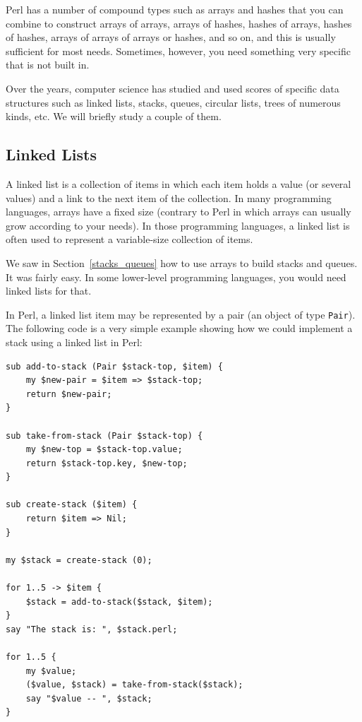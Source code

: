 Perl has a number of compound types such as arrays and hashes 
that you can combine to construct arrays of arrays, arrays of 
hashes, hashes of arrays, hashes of hashes, arrays of arrays of 
arrays or hashes, and so on, and this is usually sufficient for 
most needs. Sometimes, however, you need something very specific 
that is not built in.

Over the years, computer science has studied and used scores of 
specific data structures such as linked lists, stacks, queues, 
circular lists, trees of numerous kinds, etc. We will briefly 
study a couple of them.

\subsection{Linked Lists}
\label{linked_list}

A linked list is a collection of items in which each item holds 
a value (or several values) and a link to the next item of the 
collection. In many programming languages, arrays have a fixed 
size (contrary to Perl in which arrays can usually grow according to 
your needs). In those programming languages, a linked list 
is often used to represent a variable-size collection of items.

We saw in Section~\ref{stacks_queues} how to use arrays 
to build stacks and queues. It was fairly easy. In some 
lower-level programming languages, you would need linked 
lists for that.

In Perl, a linked list item may be represented by a pair 
(an object of type \verb'Pair'). The 
following code is a very simple example showing how 
we could implement a stack using a linked list in Perl:

\begin{verbatim}
sub add-to-stack (Pair $stack-top, $item) {
    my $new-pair = $item => $stack-top;
    return $new-pair;
}

sub take-from-stack (Pair $stack-top) {
    my $new-top = $stack-top.value;
    return $stack-top.key, $new-top;
}

sub create-stack ($item) {
    return $item => Nil;
}

my $stack = create-stack (0);

for 1..5 -> $item {
    $stack = add-to-stack($stack, $item);
}
say "The stack is: ", $stack.perl;

for 1..5 {
    my $value;
    ($value, $stack) = take-from-stack($stack);
    say "$value -- ", $stack;    
}
\end{verbatim}

